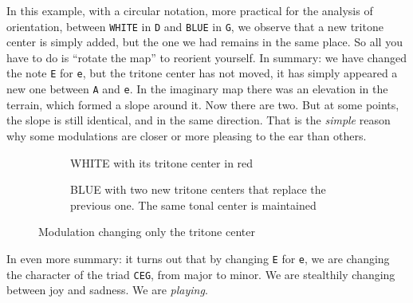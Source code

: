 \documentclass[]{report}
\begin{document}
In this example, with a circular notation, more practical for the analysis of orientation, between \texttt{WHITE} in \texttt{D} and \texttt{BLUE} in \texttt{G}, we observe that a new tritone center is simply added, but the one we had remains in the same place. So all you have to do is ``rotate the map'' to reorient yourself.
In summary: we have changed the note \texttt{E} for \texttt{e}, but the tritone center has not moved, it has simply appeared a new one between \texttt{A} and \texttt{e}. In the imaginary map there was an elevation in the terrain, which formed a slope around it. Now there are two. But at some points, the slope is still identical, and in the same direction. That is the \emph{simple} reason why some modulations are closer or more pleasing to the ear than others.
\begin{figure}[H]
\begin{subfigure}{.30\textwidth}
\centering
{}
\caption{\textsf{WHITE} with its tritone center in red}
\end{subfigure}
\hfill
\begin{subfigure}{0.30\textwidth}
\centering
{}
\caption{\textsf{BLUE} with two new tritone centers that replace the previous one. The same tonal center is maintained}
\end{subfigure}
\hfill
\caption{Modulation changing only the tritone center}\label{fig:modulation-changing-tritonal-center2}
\end{figure}
In even more summary: it turns out that by changing \texttt{E} for \texttt{e}, we are changing the character of the triad \texttt{CEG}, from major to minor. We are stealthily changing between joy and sadness. We are \emph{playing}.
\end{document}
